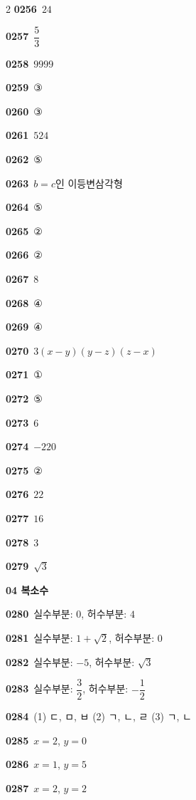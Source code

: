 \documentclass[10pt,a4paper]{article}
\begin{document}
\begin{multicols}{2}
\noindent\textbf{0256}\ $24$\par
\noindent\textbf{0257}\ $\dfrac{5}{3}$\par
\noindent\textbf{0258}\ $9999$\par
\noindent\textbf{0259}\ ③\par
\noindent\textbf{0260}\ ③\par
\noindent\textbf{0261}\ $524$\par
\noindent\textbf{0262}\ ⑤\par
\noindent\textbf{0263}\ $b=c$인 이등변삼각형\par
\noindent\textbf{0264}\ ⑤\par
\noindent\textbf{0265}\ ②\par
\noindent\textbf{0266}\ ②\par
\noindent\textbf{0267}\ $8$\par
\noindent\textbf{0268}\ ④\par
\noindent\textbf{0269}\ ④\par
\noindent\textbf{0270}\ $3(x-y)(y-z)(z-x)$\par
\noindent\textbf{0271}\ ①\par
\noindent\textbf{0272}\ ⑤\par
\noindent\textbf{0273}\ $6$\par
\noindent\textbf{0274}\ $-220$\par
\noindent\textbf{0275}\ ②\par
\noindent\textbf{0276}\ $22$\par
\noindent\textbf{0277}\ $16$\par
\noindent\textbf{0278}\ $3$\par
\noindent\textbf{0279}\ $\sqrt{3}$\par
\noindent\textbf{04 복소수}\par\smallskip
\noindent\textbf{0280}\ 실수부분: $0$, 허수부분: $4$\par
\noindent\textbf{0281}\ 실수부분: $1+\sqrt{2}$, 허수부분: $0$\par
\noindent\textbf{0282}\ 실수부분: $-5$, 허수부분: $\sqrt{3}$\par
\noindent\textbf{0283}\ 실수부분: $\dfrac{3}{2}$, 허수부분: $-\dfrac{1}{2}$\par
\noindent\textbf{0284}\ (1) ㄷ, ㅁ, ㅂ \quad (2) ㄱ, ㄴ, ㄹ \quad (3) ㄱ, ㄴ\par
\noindent\textbf{0285}\ $x=2$, $y=0$\par
\noindent\textbf{0286}\ $x=1$, $y=5$\par
\noindent\textbf{0287}\ $x=2$, $y=2$\par

\end{multicols}
\end{document}
